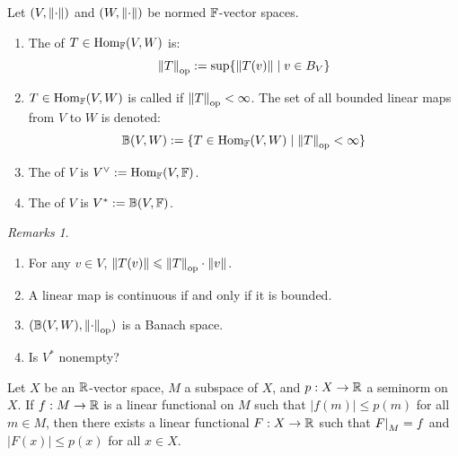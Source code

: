 \documentclass[10pt]{beamer}
\theoremstyle{plain} %
\theoremstyle{remark} %
\newtheorem*{remarks}{Remarks}
\begin{document}
\begin{frame}
    \begin{definition}
        Let $(V,\left\lVert \cdot \right\rVert)$ and $(W,\left\lVert \cdot \right\rVert)$ be normed $\mathbb{F}$-vector spaces.
        \begin{enumerate}[label = (\arabic*),itemsep=1pt,topsep=3pt]
            \item The  of $T \in \operatorname{Hom}_{\mathbb{F}}(V,W)$ is:
                \begin{equation*}
                    \left\lVert T \right\rVert_{\operatorname{op}} := \sup\{\left\lVert T(v) \right\rVert \mid v \in B_V\}
                \end{equation*}
            \item $T \in \operatorname{Hom}_{\mathbb{F}}(V,W)$ is called  if $\left\lVert T \right\rVert_{\operatorname{op}} < \infty$. The set of all bounded linear maps from $V$ to $W$ is denoted: 
                \begin{equation*}
                    \mathbb{B}(V,W) := \{T \in \operatorname{Hom}_{\mathbb{F}}(V,W) \mid \left\lVert T \right\rVert_{\operatorname{op}} < \infty\}
                \end{equation*}
            \item The  of $V$ is $V^{\lor}:=\operatorname{Hom}_{\mathbb{F}}(V,\mathbb{F})$.

            \item The  of $V$ is $V^\ast:= \mathbb{B}(V,\mathbb{F})$.
        \end{enumerate}
    \end{definition}
    \pause
    \begin{remarks}
    \begin{enumerate}[label = (\arabic*),itemsep=2pt,topsep=5pt]
        \item For any $v \in V$, $\left\lVert T(v) \right\rVert \leqslant \left\lVert T \right\rVert_{\operatorname{op}} \cdot \left\lVert v \right\rVert$.
        \item A linear map is continuous if and only if it is bounded.
        \item $(\mathbb{B}(V,W), \left\lVert \cdot\right\rVert_{\operatorname{op}})$ is a Banach space.
        \item Is $V^\ast$ nonempty?
    \end{enumerate}
    \end{remarks}
\end{frame}

\begin{frame}
    \begin{theorem}
        Let $X$ be an $\mathbb{R}$-vector space, $M$ a subspace of $X$, and $p:X \rightarrow \mathbb{R}$ a seminorm on $X$. If $f:M \rightarrow \mathbb{R}$ is a linear functional on $M$ such that $|f(m)| \leq p(m)$ for all $m \in M$, then there exists a linear functional $F:X \rightarrow \mathbb{R}$ such that $\restr{F}{M} = f$ and $|F(x)| \leq p(x)$ for all $x \in X$.
    \end{theorem}
\end{frame}
\end{document}

